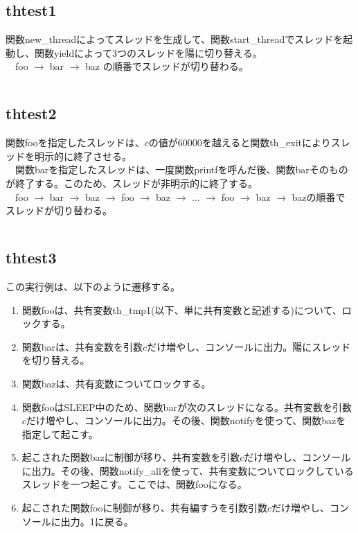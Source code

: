 \documentclass[11pt,a4paper]{jsarticle}
\begin{document}
\subsection{thtest1}
関数new\_threadによってスレッドを生成して、関数start\_threadでスレッドを起動し、関数yieldによって3つのスレッドを陽に切り替える。\\
　foo $\to$ bar $\to$ baz の順番でスレッドが切り替わる。
\begin{screen}
\begin{verbatim}
\end{verbatim}
\end{screen}

\subsection{thtest2}
関数fooを指定したスレッドは、$c$の値が$60000$を越えると関数th\_exitによりスレッドを明示的に終了させる。\\
　関数barを指定したスレッドは、一度関数printfを呼んだ後、関数barそのものが終了する。このため、スレッドが非明示的に終了する。\\
　foo $\to$ bar $\to$ baz $\to$ foo $\to$ baz $\to$ ... $\to$ foo $\to$ baz $\to$ bazの順番でスレッドが切り替わる。
\begin{screen}
\begin{verbatim}
\end{verbatim}
\end{screen}

\subsection{thtest3}
この実行例は、以下のように遷移する。
\begin{enumerate}
	\item 関数fooは、共有変数th\_tmp1(以下、単に共有変数と記述する)について、ロックする。
	\item 関数barは、共有変数を引数$c$だけ増やし、コンソールに出力。陽にスレッドを切り替える。
	\item 関数bazは、共有変数についてロックする。
	\item 関数fooはSLEEP中のため、関数barが次のスレッドになる。共有変数を引数$c$だけ増やし、コンソールに出力。その後、関数notifyを使って、関数bazを指定して起こす。
	\item 起こされた関数bazに制御が移り、共有変数を引数$c$だけ増やし、コンソールに出力。その後、関数notify\_allを使って、共有変数についてロックしているスレッドを一つ起こす。ここでは、関数fooになる。
	\item 起こされた関数fooに制御が移り、共有編すうを引数引数$c$だけ増やし、コンソールに出力。1に戻る。
\end{enumerate}
\end{document}
